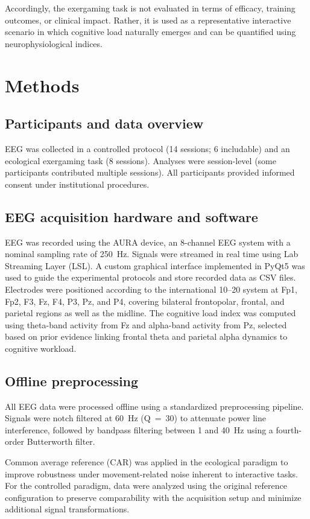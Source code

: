 \documentclass[10pt]{iopart}
\begin{document}
Accordingly, the exergaming task is not evaluated in terms of efficacy, training outcomes, or clinical impact. Rather, it is used as a representative interactive scenario in which cognitive load naturally emerges and can be quantified using neurophysiological indices.



\section{Methods}

\subsection{Participants and data overview}
EEG was collected in a controlled protocol (14 sessions; 6 includable) and an ecological exergaming task (8 sessions). Analyses were session-level (some participants contributed multiple sessions). All participants provided informed consent under institutional procedures.

\subsection{EEG acquisition hardware and software}
EEG was recorded using the AURA device, an 8-channel EEG system with a nominal sampling rate of 250~Hz. Signals were streamed in real time using Lab Streaming Layer (LSL). A custom graphical interface implemented in PyQt5 was used to guide the experimental protocols and store recorded data as CSV files. Electrodes were positioned according to the international 10--20 system at Fp1, Fp2, F3, Fz, F4, P3, Pz, and P4, covering bilateral frontopolar, frontal, and parietal regions as well as the midline. The cognitive load index was computed using theta-band activity from Fz and alpha-band activity from Pz, selected based on prior evidence linking frontal theta and parietal alpha dynamics to cognitive workload.

\subsection{Offline preprocessing}
All EEG data were processed offline using a standardized preprocessing pipeline. Signals were notch filtered at 60~Hz (Q~=~30) to attenuate power line interference, followed by bandpass filtering between 1 and 40~Hz using a fourth-order Butterworth filter.

Common average reference (CAR) was applied in the ecological paradigm to improve robustness under movement-related noise inherent to interactive tasks. For the controlled paradigm, data were analyzed using the original reference configuration to preserve comparability with the acquisition setup and minimize additional signal transformations.
\end{document}
